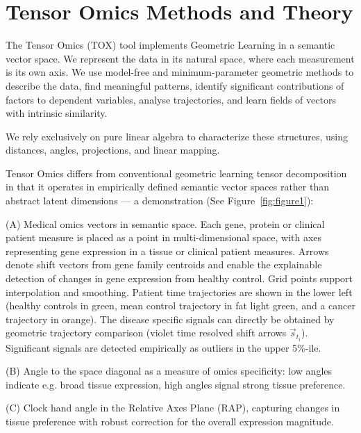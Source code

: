 \section{Tensor Omics Methods and Theory}

The Tensor Omics (TOX) tool implements Geometric Learning in a semantic vector space. We represent the data in its natural space, where each measurement is its own axis. We use model-free and minimum-parameter geometric methods to describe the data, find meaningful patterns, identify significant contributions of factors to dependent variables, analyse trajectories, and learn fields of vectors with intrinsic similarity. 

We rely exclusively on pure linear algebra to characterize these structures, using distances, angles, projections, and linear mapping.

\vspace{0.5cm}
Tensor Omics differs from conventional geometric learning tensor decomposition in that it operates in empirically defined semantic vector spaces rather than abstract latent dimensions --- a demonstration (See Figure~\ref{fig:figure1}):

\vspace{0.5cm}
(A) Medical omics vectors in semantic space. Each gene, protein or clinical patient measure is placed as a point in multi-dimensional space, with axes representing gene expression in a tissue or clinical patient measures. Arrows denote shift vectors from gene family centroids and enable the explainable detection of changes in gene expression from healthy control. Grid points support interpolation and smoothing. Patient time trajectories are shown in the lower left (healthy controls in green, mean control trajectory in fat light green, and a cancer trajectory in orange). The disease specific signals can directly be obtained by geometric trajectory comparison (violet time resolved shift arrows $\vec{s}_{t_i}$). Significant signals are detected empirically as outliers in the upper 5\%-ile.

\vspace{0.5cm}
(B) Angle to the space diagonal as a measure of omics specificity: low angles indicate e.g. broad tissue expression, high angles signal strong tissue preference.

\vspace{0.5cm}
(C) Clock hand angle in the Relative Axes Plane (RAP), capturing changes in tissue preference with robust correction for the overall expression magnitude.

